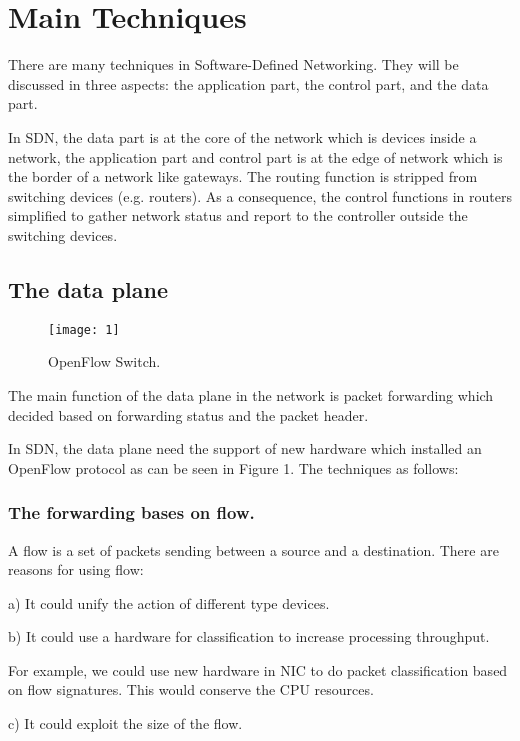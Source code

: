 \documentclass[conference]{IEEEtran}
\begin{document}
\section{Main Techniques}
There are many techniques in Software-Defined Networking. They will be discussed in three aspects: the application part, the control part, and the data part. 

In SDN, the data part is at the core of the network which is devices inside a network, the application part and control part is at the edge of network which is the border of a network like gateways. The routing function is stripped from switching devices (e.g. routers). As a consequence, the control functions in routers simplified to gather network status and report to the controller outside the switching devices.

\subsection{The data plane}
\begin{figure}[!t]
\centering
\texttt{[image: 1]}
\caption{OpenFlow Switch.}
\label{fig_sim}
\end{figure}

The main function of the data plane in the network is packet forwarding which decided based on forwarding status and the packet header.

In SDN, the data plane need the support of new hardware which installed an OpenFlow protocol as can be seen in Figure 1. The techniques as follows:


\subsubsection{The forwarding bases on flow.}
A flow is a set of packets sending between a source and a destination. There are reasons for using flow:

a) It could unify the action of different type devices. 

b) It could use a hardware for classification to increase processing throughput. 

For example, we could use new hardware in NIC to do packet classification based on flow signatures. This would conserve the CPU resources.

c) It could exploit the size of the flow. 
\end{document}
